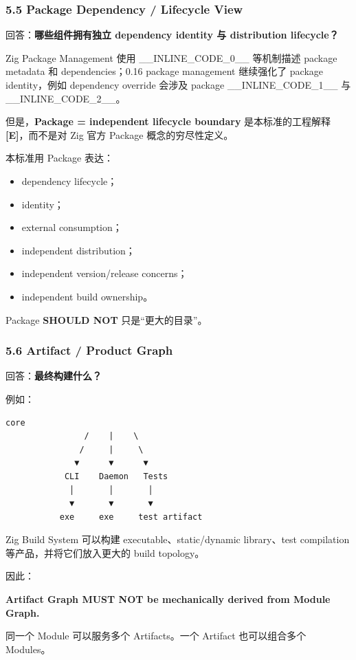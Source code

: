 \documentclass[11pt,a4paper]{article}
\begin{document}
\subsubsection{5.5 Package Dependency / Lifecycle View}
回答：\textbf{哪些组件拥有独立 dependency identity 与 distribution lifecycle？}

Zig Package Management 使用 \_\_INLINE\_CODE\_0\_\_ 等机制描述 package metadata 和 dependencies；0.16 package management 继续强化了 package identity，例如 dependency override 会涉及 package \_\_INLINE\_CODE\_1\_\_ 与 \_\_INLINE\_CODE\_2\_\_。

但是，\textbf{Package = independent lifecycle boundary} 是本标准的工程解释 \textbf{[E]}，而不是对 Zig 官方 Package 概念的穷尽性定义。

本标准用 Package 表达：

\begin{itemize}
  \item dependency lifecycle；
  \item identity；
  \item external consumption；
  \item independent distribution；
  \item independent version/release concerns；
  \item independent build ownership。
\end{itemize}
Package \textbf{SHOULD NOT} 只是“更大的目录”。

\subsubsection{5.6 Artifact / Product Graph}
回答：\textbf{最终构建什么？}

例如：

\begin{lstlisting}[language=text]
                   core
                /    |    \
               /     |     \
              ▼      ▼      ▼
            CLI    Daemon   Tests
             │       │       │
             ▼       ▼       ▼
           exe     exe     test artifact
\end{lstlisting}
Zig Build System 可以构建 executable、static/dynamic library、test compilation 等产品，并将它们放入更大的 build topology。

因此：

\begin{gfmBlockquote}
\textbf{Artifact Graph MUST NOT be mechanically derived from Module Graph.}
\end{gfmBlockquote}
同一个 Module 可以服务多个 Artifacts。一个 Artifact 也可以组合多个 Modules。
\end{document}
